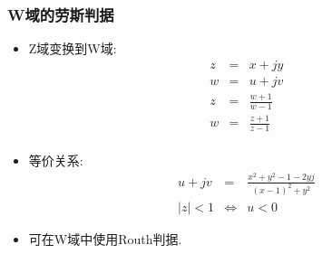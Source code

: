 \documentclass[table]{beamer}
\begin{document}
\begin{frame}
\frametitle{W域的劳斯判据}
\label{sec-2-1}

\begin{itemize}
\item Z域变换到W域:
      \begin{eqnarray*}
       z & = & x+jy\\
       w &= & u+jv \\
       z & = &\frac{w+1}{w-1} \\
       w &= & \frac{z+1}{z-1} \\
      \end{eqnarray*}
\item <2->等价关系:
      \begin{eqnarray*}
      u+jv &=& \frac{x^2+y^2-1-2yj}{(x-1)^2+y^2} \\
      |z|<1 &\Leftrightarrow& u<0 
      \end{eqnarray*}
\item <3->可在W域中使用Routh判据.
\end{itemize}
\end{frame}
\end{document}
